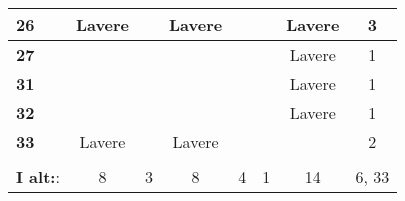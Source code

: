 \begin{longtable}{|l|c|c|c|c|c|c|c|}
\cellcolor[HTML]{C0C0C0}\textbf{26} & Lavere & & Lavere & & & Lavere  & \cellcolor[HTML]{EFEFEF} 3\\\hline
\cellcolor[HTML]{C0C0C0}\textbf{27} & & &  &  & & Lavere  & \cellcolor[HTML]{EFEFEF} 1\\\hline
\cellcolor[HTML]{C0C0C0}\textbf{31} & & &  &  & & Lavere & \cellcolor[HTML]{EFEFEF} 1 \\\hline
\cellcolor[HTML]{C0C0C0}\textbf{32} & & & & & & Lavere & \cellcolor[HTML]{EFEFEF}1 \\\hline
\cellcolor[HTML]{C0C0C0}\textbf{33} & Lavere & & Lavere & & & & \cellcolor[HTML]{EFEFEF} 2\\\hline
\rowcolor[HTML]{EFEFEF}\multicolumn{8}{|r|}{\textbf{Gennemsnit:}}\\ 
\rowcolor[HTML]{EFEFEF} \textbf{I alt:}: & 8 & 3 & 8 & 4 & 1 & 14  & 6, 33\\ \hline
\end{longtable}


